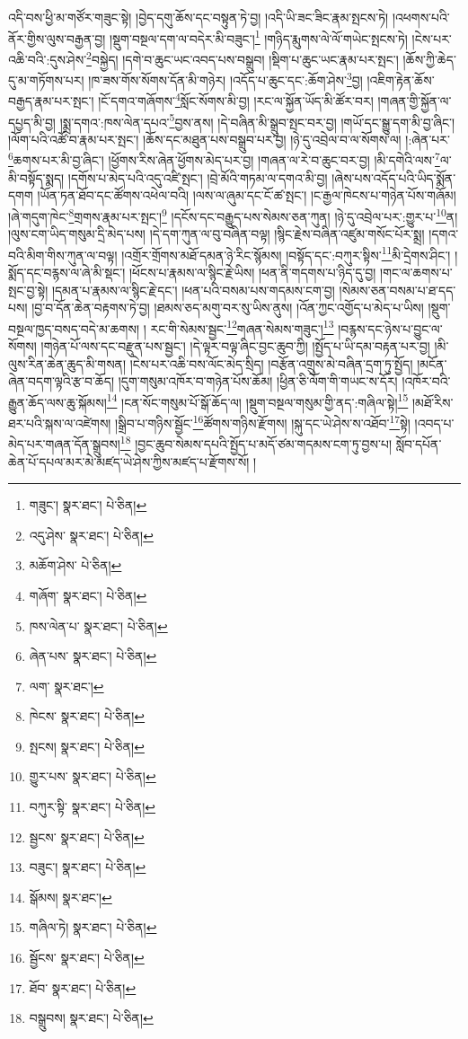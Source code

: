 འདི་བས་ཕྱི་མ་གཙོར་གཟུང་སྟེ། །བྱེད་དགུ་ཆོས་དང་བསྟུན་ཏེ་བྱ། །འདི་ཡི་ཟང་ཟིང་རྣམ་སྤངས་ཏེ། །འཕགས་པའི་ནོར་གྱིས་ལུས་བརྒྱན་བྱ། །སྡུག་བསྔལ་དག་ལ་བདེར་མི་བཟུང་།\footnote{གཟུང་།  སྣར་ཐང་།  པེ་ཅིན། } །གཉིད་རྨུགས་ལེ་ལོ་གཡེང་སྤངས་ཏེ། །ངེས་པར་འཆི་བའི་:དུས་ཤེས་\footnote{འདུ་ཤེས་  སྣར་ཐང་།  པེ་ཅིན། }བསྐྱེད། །དགེ་བ་ཆུང་ཡང་འབད་པས་བསྒྲུབ། །སྡིག་པ་ཆུང་ཡང་རྣམ་པར་སྤང་། །ཆོས་ཀྱི་ཆེད་དུ་མ་གཏོགས་པར། །ཁ་ཟས་གོས་སོགས་དོན་མི་གཉེར། །འདོད་པ་ཆུང་དང་:ཆོག་ཤེས་\footnote{མཆོག་ཤེས་  པེ་ཅིན། }བྱ། །འཇིག་རྟེན་ཆོས་བརྒྱད་རྣམ་པར་སྤང་། །ངོ་དགའ་གཞོགས་\footnote{གཞོག་  སྣར་ཐང་།  པེ་ཅིན། }སློང་སོགས་མི་བྱ། །རང་ལ་སྐྱོན་ཡོད་མི་ཚོར་བར། །གཞན་གྱི་སྐྱོན་ལ་དཔྱད་མི་བྱ། །སྨྲ་དགའ་:ཁས་ལེན་དཔའ་\footnote{ཁས་ལེན་པ་  སྣར་ཐང་།  པེ་ཅིན། }བྱས་ནས། །དེ་བཞིན་མི་སྒྲུབ་སྤང་བར་བྱ། །གཡོ་དང་སྒྱུ་དག་མི་བྱ་ཞིང་། །ལོག་པའི་འཚོ་བ་རྣམ་པར་སྤང་། །ཆོས་དང་མཐུན་པས་བསྒྲུབ་པར་བྱ། །ཉེ་དུ་འབྲེལ་བ་ལ་སོགས་ལ། །:ཞེན་པར་\footnote{ཞེན་པས་  སྣར་ཐང་།  པེ་ཅིན། }ཆགས་པར་མི་བྱ་ཞིང་། །ཕྱོགས་རིས་ཞེན་ཕྱོགས་མེད་པར་བྱ། །གཞན་ལ་རེ་བ་ཆུང་བར་བྱ། །མི་དགེའི་ལས་\footnote{ལག་  སྣར་ཐང་། }ལ་མི་བསྟོད་སྨད། །དགོས་པ་མེད་པའི་འདུ་འཛི་སྤང་། །བྲེ་མོའི་གཏམ་ལ་དགའ་མི་བྱ། །ཞེས་པས་འདོད་པའི་ཡིད་སྨོན་དགག །ཡོན་ཏན་ཐོབ་དང་ཚོགས་འཕེལ་བའི། །ལས་ལ་ཞུམ་དང་ངོ་ཚ་སྤང་། །ང་རྒྱལ་ཁེངས་པ་གཉེན་པོས་གཞོམ། །ཞེ་གདུག་ཁེང་\footnote{ཁེངས་  སྣར་ཐང་།  པེ་ཅིན། }གྲགས་རྣམ་པར་སྤང་།\footnote{སྤངས།  སྣར་ཐང་།  པེ་ཅིན། } །དངོས་དང་བརྒྱུད་པས་སེམས་ཅན་ཀུན། །ཉེ་དུ་འབྲེལ་པར་:གྱུར་པ་\footnote{གྱུར་པས་  སྣར་ཐང་།  པེ་ཅིན། }ན། །ལུས་ངག་ཡིད་གསུམ་དྲི་མེད་པས། །དེ་དག་ཀུན་ལ་བུ་བཞིན་བལྟ། །སྙིང་རྗེས་བཞིན་འཛུམ་གསོང་པོར་སྨྲ། །དགའ་བའི་མིག་གིས་ཀུན་ལ་བལྟ། །འགྲོར་གྲོགས་མཐོ་དམན་ཉེ་རིང་སྙོམས། །བསྟོད་དང་:བཀུར་སྟིས་\footnote{བཀུར་སྟི་  སྣར་ཐང་།  པེ་ཅིན། }མི་དྲེགས་ཤིང་། །སྨོད་དང་བརྙས་ལ་ཞེ་མི་སྡང་། །ཕོངས་པ་རྣམས་ལ་སྙིང་རྗེ་ཡིས། །ཕན་ནི་གདགས་པ་ཉིད་དུ་བྱ། །གང་ལ་ཆགས་པ་སྤང་བྱ་སྟེ། །དམན་པ་རྣམས་ལ་སྙིང་རྗེ་དང་། །ཕན་པའི་བསམ་པས་གདམས་ངག་བྱ། །སེམས་ཅན་བསམ་པ་ཐ་དད་པས། །བྱ་བ་དོན་ཆེན་བརྟགས་ཏེ་བྱ། །ཐམས་ཅད་མགུ་བར་སུ་ཡིས་ནུས། །འོན་ཀྱང་འགྱོད་པ་མེད་པ་ཡིས། །སྡུག་བསྔལ་ཁྱད་བསད་བདེ་མ་ཆགས། །
རང་གི་སེམས་སྦྱང་\footnote{སྦྱངས་  སྣར་ཐང་།  པེ་ཅིན། }གཞན་སེམས་གཟུང་།\footnote{བཟུང་།  སྣར་ཐང་།  པེ་ཅིན། } །བརྙས་དང་ཉེས་པ་བྱུང་ལ་སོགས། །གཉེན་པོ་ལས་དང་བརྫུན་པས་སྦྱང་། །དེ་ལྟར་བལྟ་ཞིང་བྱང་ཆུབ་ཀྱི། །སྤྱོད་པ་ཡི་དམ་བརྟན་པར་བྱ། །མི་ལུས་རིན་ཆེན་ཆུད་མི་གསན། །ངེས་པར་འཆི་བས་ལོང་མེད་སྲིད། །བརྩོན་འགྲུས་མེ་བཞིན་དྲག་ཏུ་སྤྱོད། །མངོན་ཞེན་བདག་ལྟའི་རྩ་བ་ཆོད། །དུག་གསུམ་འཁོར་བ་གཉེན་པོས་ཆོམ། །ཕྱིན་ཅི་ལོག་གི་གཡང་ས་དོར། །འཁོར་བའི་རྒྱུན་ཆོད་ལས་ཆུ་སྐོམས།\footnote{སྒོམས།  སྣར་ཐང་། } །ངན་སོང་གསུམ་པོ་སྒོ་ཆོད་ལ། །སྡུག་བསྔལ་གསུམ་གྱི་ནད་:གཞིལ་སྟེ།\footnote{གཞིལ་ཏེ།  སྣར་ཐང་།  པེ་ཅིན། } །མཐོ་རིས་ཐར་པའི་སྐས་ལ་འཛེགས། །སྒྲིབ་པ་གཉིས་སྦྱོང་\footnote{སྦྱོངས་  སྣར་ཐང་།  པེ་ཅིན། }ཚོགས་གཉིས་རྫོགས། །སྐུ་དང་ཡེ་ཤེས་ས་འཐོབ་\footnote{ཐོབ་  སྣར་ཐང་།  པེ་ཅིན། }སྟེ། །འབད་པ་མེད་པར་གཞན་དོན་སྒྲུབས།\footnote{བསྒྲུབས།  སྣར་ཐང་།  པེ་ཅིན། } །བྱང་ཆུབ་སེམས་དཔའི་སྤྱོད་པ་མདོ་ཙམ་གདམས་ངག་ཏུ་བྱས་པ། སློབ་དཔོན་ཆེན་པོ་དཔལ་མར་མེ་མཛད་ཡེ་ཤེས་ཀྱིས་མཛད་པ་རྫོགས་སོ། ། 